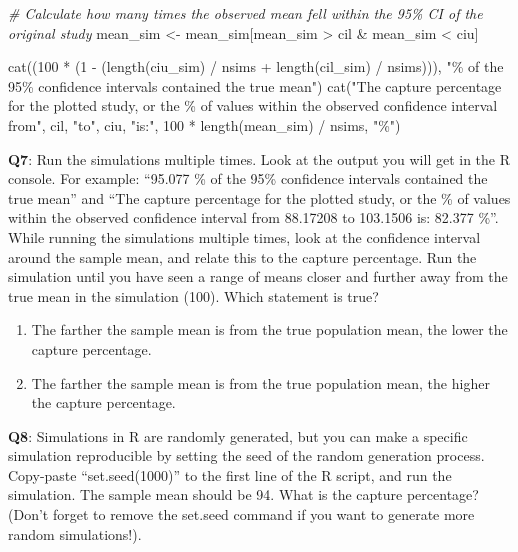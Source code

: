 \documentclass[
  oneside]{krantz}
\makeatletter
\newenvironment{Shaded}{\begin{snugshade}}{\end{snugshade}}
\newcommand{\CommentTok}[1]{\textcolor[rgb]{0.37,0.37,0.37}{\textit{#1}}}
\newcommand{\DecValTok}[1]{\textcolor[rgb]{0.06,0.06,0.06}{#1}}
\newcommand{\FunctionTok}[1]{\textcolor[rgb]{0,0,0}{#1}}
\newcommand{\NormalTok}[1]{#1}
\newcommand{\OtherTok}[1]{\textcolor[rgb]{0.37,0.37,0.37}{#1}}
\newcommand{\SpecialCharTok}[1]{\textcolor[rgb]{0,0,0}{#1}}
\newcommand{\StringTok}[1]{\textcolor[rgb]{0.5,0.5,0.5}{#1}}
\providecommand{\tightlist}{%
  \setlength{\itemsep}{0pt}\setlength{\parskip}{0pt}}
\newenvironment{kframe}{%
\medskip{}
\setlength{\fboxsep}{.8em}
 \def\at@end@of@kframe{}%
 \ifinner\ifhmode%
  \def\at@end@of@kframe{\end{minipage}}%
  \begin{minipage}{\columnwidth}%
 \fi\fi%
 \def\FrameCommand##1{\hskip\@totalleftmargin \hskip-\fboxsep
 \colorbox{shadecolor}{##1}\hskip-\fboxsep
     \hskip-\linewidth \hskip-\@totalleftmargin \hskip\columnwidth}%
 \MakeFramed {\advance\hsize-\width
   \@totalleftmargin\z@ \linewidth\hsize
   \@setminipage}}%
 {\par\unskip\endMakeFramed%
 \at@end@of@kframe}
\renewenvironment{Shaded}{\begin{kframe}}{\end{kframe}}
\makeatother
\begin{document}
\begin{Shaded}
\begin{Highlighting}[]
\CommentTok{\# Calculate how many times the observed mean fell within the 95\% CI of the original study}
\NormalTok{mean\_sim }\OtherTok{\textless{}{-}}\NormalTok{ mean\_sim[mean\_sim }\SpecialCharTok{\textgreater{}}\NormalTok{ cil }\SpecialCharTok{\&}\NormalTok{ mean\_sim }\SpecialCharTok{\textless{}}\NormalTok{ ciu]}

\FunctionTok{cat}\NormalTok{((}\DecValTok{100} \SpecialCharTok{*}\NormalTok{ (}\DecValTok{1} \SpecialCharTok{{-}}\NormalTok{ (}\FunctionTok{length}\NormalTok{(ciu\_sim) }\SpecialCharTok{/}\NormalTok{ nsims }\SpecialCharTok{+} \FunctionTok{length}\NormalTok{(cil\_sim) }\SpecialCharTok{/}\NormalTok{ nsims))),}
    \StringTok{"\% of the 95\% confidence intervals contained the true mean"}\NormalTok{)}
\FunctionTok{cat}\NormalTok{(}\StringTok{"The capture percentage for the plotted study, or the \% of values within}
\StringTok{    the observed confidence interval from"}\NormalTok{, cil, }\StringTok{"to"}\NormalTok{, ciu,}
    \StringTok{"is:"}\NormalTok{, }\DecValTok{100} \SpecialCharTok{*} \FunctionTok{length}\NormalTok{(mean\_sim) }\SpecialCharTok{/}\NormalTok{ nsims, }\StringTok{"\%"}\NormalTok{)}
\end{Highlighting}
\end{Shaded}

\textbf{Q7}: Run the simulations multiple times. Look at the output you will get in the R console. For example: ``95.077 \% of the 95\% confidence intervals contained the true mean'' and ``The capture percentage for the plotted study, or the \% of values within the observed confidence interval from 88.17208 to 103.1506 is: 82.377 \%''. While running the simulations multiple times, look at the confidence interval around the sample mean, and relate this to the capture percentage. Run the simulation until you have seen a range of means closer and further away from the true mean in the simulation (100). Which statement is true?

\begin{enumerate}
\def\labelenumi{\Alph{enumi})}
\tightlist
\item
  The farther the sample mean is from the true population mean, the lower the capture percentage.
\item
  The farther the sample mean is from the true population mean, the higher the capture percentage.
\end{enumerate}

\textbf{Q8}: Simulations in R are randomly generated, but you can make a specific simulation reproducible by setting the seed of the random generation process. Copy-paste ``set.seed(1000)'' to the first line of the R script, and run the simulation. The sample mean should be 94. What is the capture percentage? (Don't forget to remove the set.seed command if you want to generate more random simulations!).
\end{document}
